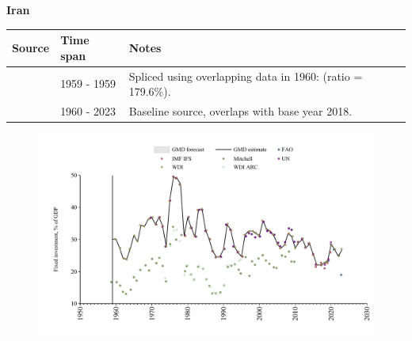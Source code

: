 \documentclass[12pt,a4paper,landscape]{article}
\begin{document}
\begin{adjustbox}{max totalsize={\paperwidth}{\paperheight},center}
\begin{minipage}[t][\textheight][t]{\textwidth}
\vspace*{0.5cm}
{}
\begin{center}
{\Large\bfseries Iran}
\end{center}
\vspace{0.5cm}
\begin{table}[H]
\centering
\small
\begin{tabular}{|l|l|l|}
\hline
\textbf{Source} & \textbf{Time span} & \textbf{Notes} \\
\hline
\rowcolor{white}\cite{Mitchell}& 1959 - 1959 &Spliced using overlapping data in 1960: (ratio = 179.6\%).\\
\rowcolor{lightgray}\cite{WDI}& 1960 - 2023 &Baseline source, overlaps with base year 2018.\\
\hline
\end{tabular}
\end{table}
\begin{figure}[H]
\centering
\includegraphics[width=\textwidth,height=0.6\textheight,keepaspectratio]{graphs/IRN_finv_GDP.pdf}
\end{figure}
\end{minipage}
\end{adjustbox}
\end{document}
